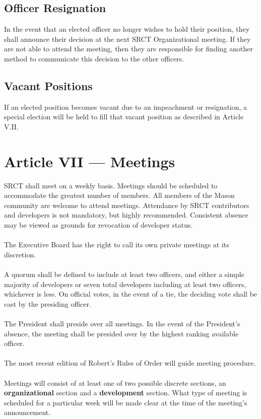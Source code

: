 \documentclass{article}
\begin{document}
  \subsection{Officer Resignation}
  In the event that an elected officer no longer wishes to hold their 
  position, they shall announce their decision at the next SRCT Organizational 
  meeting. If they are not able to attend the meeting, then they are 
  responsible for finding another method to communicate this decision to 
  the other officers.

  \subsection{Vacant Positions}
  If an elected position becomes vacant due to an impeachment or 
  resignation, a special election will be held to fill that vacant 
  position as described in Article V.II.

  
  \section{Article VII --- Meetings}
  SRCT shall meet on a weekly basis. Meetings should be scheduled to 
  accommodate the greatest number of members. All members of the Mason
  community are welcome to attend meetings. Attendance by SRCT 
  contributors and developers is not mandatory, but highly recommended. 
  Consistent absence may be viewed as grounds for revocation of 
  developer status.
  \\ \\
  The Executive Board has the right to call its own private meetings at
  its discretion.
  \\ \\
  A quorum shall be defined to include at least two officers, and either 
  a simple majority of developers or seven total developers including at
  least two officers, whichever is less. On official votes, in the event
  of a tie, the deciding vote shall be cast by the presiding officer.
  \\ \\
  The President shall preside over all meetings. In the event of the 
  President's absence, the meeting shall be presided over by the highest
  ranking available officer.
  \\ \\
  The most recent edition of Robert's Rules of Order will guide meeting 
  procedure.
  \\ \\
  Meetings will consist of at least one of two possible discrete 
  sections, an \textbf{organizational} section and a 
  \textbf{development} section. What type of meeting is scheduled for a
  particular week will be made clear at the time of the meeting's 
  announcement.
  
\end{document}

